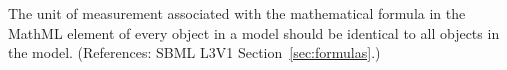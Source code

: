 The unit of measurement associated with the mathematical formula in the
MathML  element of every \KineticLaw object in a model should
be identical to all \KineticLaw objects in the model.  (References: SBML
L3V1 Section~\ref{sec:formulas}.)
